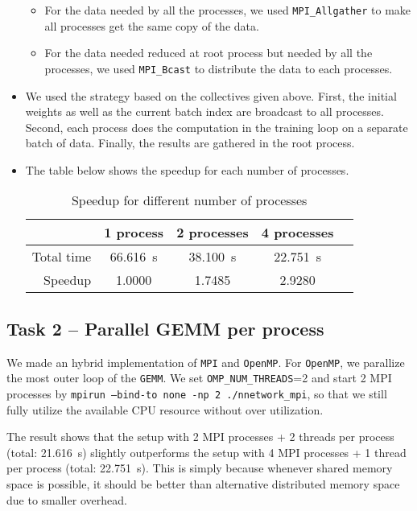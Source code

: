 \documentclass[a4paper, DIV12, headsepline]{scrartcl}
\begin{document}
\begin{itemize}
\begin{itemize}
\item For the data needed by all the processes, we used  \texttt{MPI\_Allgather} to make all processes get the same copy of the data.

\item For the data needed reduced at root process but needed by all the processes, we used  \texttt{MPI\_Bcast} to distribute the data to each processes.
\end{itemize}

\item We used the strategy based on the collectives given above. First, the initial weights as well as the current batch index are broadcast to all processes. Second, each process does the computation in the training loop on a separate batch of data. Finally, the results are gathered in the root process.

\item The table below shows the speedup for each number of processes.
\begin{table}[htbp]
\centering
{}
\begin{tabular}{rSSSS}
\hline
{} & {1 process} & {2 processes} & {4 processes} \\
\hline
Total time & \SI{66.616}{s}  & \SI{38.100}{s}  & \SI{22.751}{s}   \\
Speedup & \SI{1.0000}{} & \SI{1.7485}{} & \SI{2.9280}{} \\
\hline
\end{tabular}
\caption{Speedup for different number of processes}
\label{tab:tab22}
\end{table}

%
%

\end{itemize}

\subsection*{Task 2 -- Parallel GEMM per process}
We made an hybrid implementation of \texttt{MPI} and \texttt{OpenMP}. For \texttt{OpenMP}, we parallize the most outer loop of the \texttt{GEMM}.
We set \texttt{OMP\_NUM\_THREADS}=2 and start 2 MPI processes by \texttt{mpirun --bind-to none -np 2 ./nnetwork\_mpi}, so that we still fully utilize the available CPU resource without over utilization.

The result shows that the setup with 2 MPI processes + 2 threads per process (total: \SI{21.616}{s}) slightly outperforms the setup with 4 MPI processes + 1 thread per process (total: \SI{22.751}{s}).
This is simply because whenever shared memory space is possible, it should be better than alternative distributed memory space due to smaller overhead.
\end{document}
